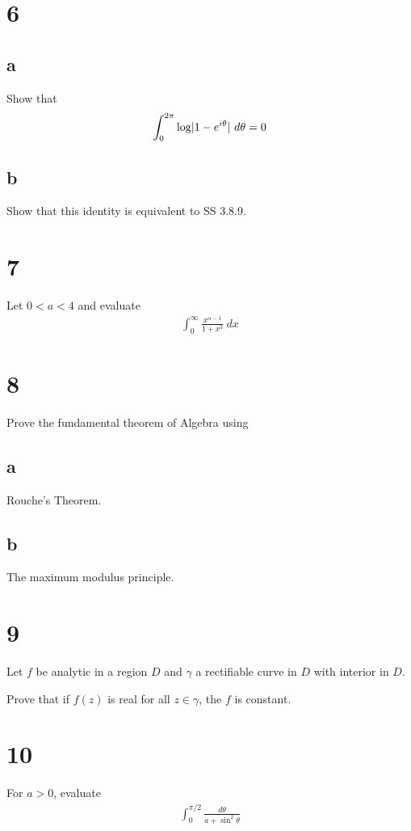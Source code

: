 \documentclass{scrreport}
\DeclarePairedDelimiter\abs{\lvert}{\rvert}%
\begin{document}
\section{6}

\subsection{a}
Show that
\begin{align}
    \int_0^{2\pi} \log\abs{1 - e^{i\theta}}~d\theta = 0
\end{align}

\subsection{b}
Show that this identity is equivalent to SS 3.8.9.

\section{7}
Let $0<a<4$ and evaluate
\begin{align}
    \int_0^\infty \frac{x^{\alpha-1}}{1+x^3} ~dx
\end{align}

\section{8}
Prove the fundamental theorem of Algebra using

\subsection{a}
Rouche's Theorem.

\subsection{b}
The maximum modulus principle.

\section{9}
Let $f$ be analytic in a region $D$ and $\gamma$ a rectifiable curve in $D$ with interior in $D$.

Prove that if $f(z)$ is real for all $z\in \gamma$, the $f$ is constant.

\section{10}
For $a> 0 $, evaluate
\begin{align}
    \int_0^{\pi/2} \frac{d\theta}{a + \sin^2 \theta}
\end{align}
\end{document}
